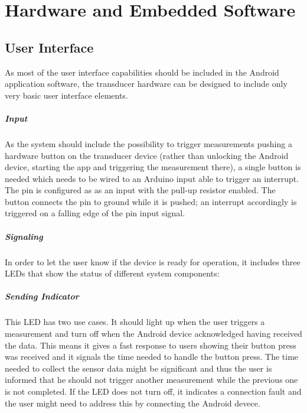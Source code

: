 \chapter{Hardware and Embedded Software}
\label{cha:hardware}

\section{User Interface}
As most of the user interface capabilities should be included in the Android application software, the transducer hardware can be designed to include only very basic user interface elements.

\paragraph{Input}
As the system should include the possibility to trigger measurements pushing a hardware button on the transducer device (rather than unlocking the Android device, starting the app and triggering the measurement there), a single button is needed which needs to be wired to an Arduino input able to trigger an interrupt. The pin is configured as as an input with the pull-up resistor enabled. The button connects the pin to ground while it is pushed; an interrupt accordingly is triggered on a falling edge of the pin input signal.

\paragraph{Signaling}
In order to let the user know if the device is ready for operation, it includes three LEDs that show the status of different system components:

\paragraph{Sending Indicator}
This LED has two use cases. It should light up when the user triggers a measurement and turn off when the Android device acknowledged having received the data. This means it gives a fast response to users showing their button press was received and it signals the time needed to handle the button press. The time needed to collect the sensor data might be significant and thus the user is informed that he should not trigger another measurement while the previous one is not completed. If the LED does not turn off, it indicates a connection fault and the user might need to address this by connecting the Android devece.


